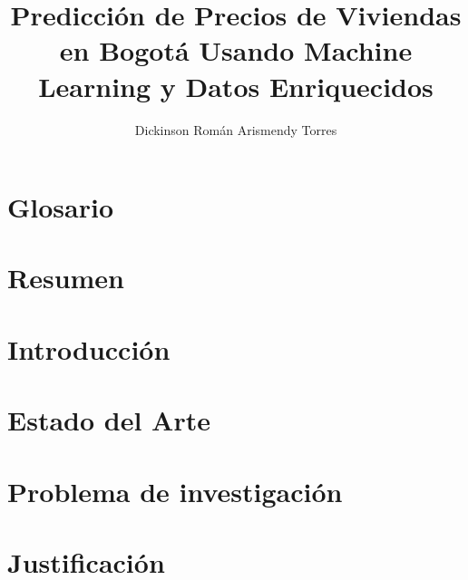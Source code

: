 \documentclass[12pt]{MIA-USA}
\title{Predicción de Precios de Viviendas en Bogotá Usando Machine Learning y Datos Enriquecidos}
\author{Dickinson Román Arismendy Torres}
\begin{document}
	
    \maketitle
    
    \tableofcontents
    \listoffigures
    \listoftables
    
    
    
    \chapter*{Glosario}
    
 	
    \chapter*{Resumen}
    

    \chapter{Introducci\'on}
    
    
    \chapter{Estado del Arte}
    
    
    \chapter{Problema de investigaci\'on}
    
    
    \chapter{Justificaci\'on}
    
    
\end{document}
